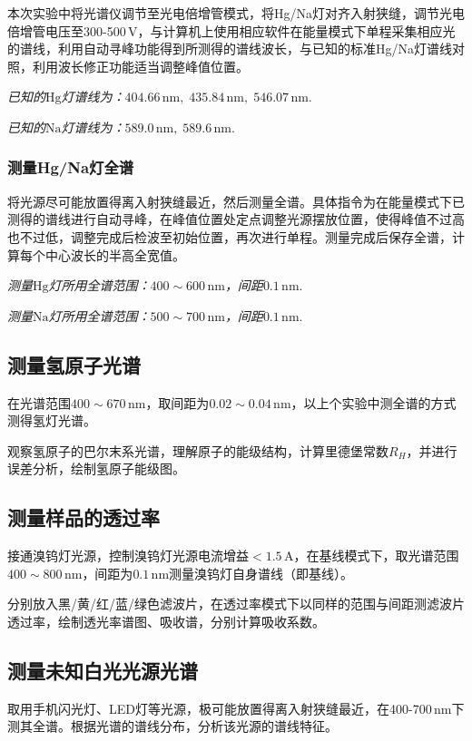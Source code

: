 \documentclass[UTF-8,twoside,cs4size]{ctexart}
\begin{document}
	本次实验中将光谱仪调节至光电倍增管模式，将Hg/Na灯对齐入射狭缝，调节光电倍增管电压至300-500\,V，与计算机上使用相应软件在能量模式下单程采集相应光的谱线，利用自动寻峰功能得到所测得的谱线波长，与已知的标准Hg/Na灯谱线对照，利用波长修正功能适当调整峰值位置。
	
	\textit{已知的$ \mathrm{Hg} $灯谱线为：$ 404.66\,\mathrm{nm},\;435.84\,\mathrm{nm},\;546.07\,\mathrm{nm} $}.
	
	\textit{已知的$ \mathrm{Na} $灯谱线为：$ 589.0\,\mathrm{nm},\;589.6\,\mathrm{nm} $}.
	
	\subsubsection{测量Hg/Na灯全谱}
	将光源尽可能放置得离入射狭缝最近，然后测量全谱。具体指令为在能量模式下已测得的谱线进行自动寻峰，在峰值位置处定点调整光源摆放位置，使得峰值不过高也不过低，调整完成后检波至初始位置，再次进行单程。测量完成后保存全谱，计算每个中心波长的半高全宽值。
	
	\textit{测量$ \mathrm{Hg} $灯所用全谱范围：$ 400\sim600\,\mathrm{nm} $，间距$ 0.1\,\mathrm{nm} $}.
	
	\textit{测量$ \mathrm{Na} $灯所用全谱范围：$ 500\sim700\,\mathrm{nm} $，间距$ 0.1\,\mathrm{nm} $}.
	
	\subsection{测量氢原子光谱}
	在光谱范围$ 400\sim670\,\mathrm{nm} $，取间距为$ 0.02\sim0.04\,\mathrm{nm} $，以上个实验中测全谱的方式测得氢灯光谱。
	
	观察氢原子的巴尔末系光谱，理解原子的能级结构，计算里德堡常数$ R_H $，并进行误差分析，绘制氢原子能级图。
	
	\subsection{测量样品的透过率}
	接通溴钨灯光源，控制溴钨灯光源电流增益$ <1.5\,\mathrm{A} $，在基线模式下，取光谱范围$ 400\sim800\,\mathrm{nm} $，间距为$ 0.1\,\mathrm{nm} $测量溴钨灯自身谱线（即基线）。
	
	分别放入黑/黄/红/蓝/绿色滤波片，在透过率模式下以同样的范围与间距测滤波片透过率，绘制透光率谱图、吸收谱，分别计算吸收系数。
	
	\subsection{测量未知白光光源光谱}
	取用手机闪光灯、LED灯等光源，极可能放置得离入射狭缝最近，在400-700\,nm下测其全谱。根据光谱的谱线分布，分析该光源的谱线特征。
\end{document}
